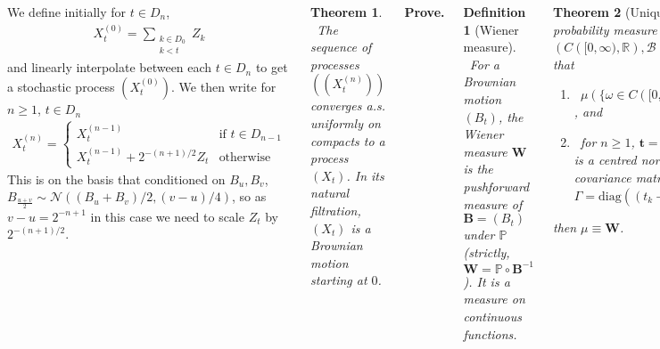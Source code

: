 \documentclass{tikzposter} %
\newcommand\rightopen[2]{\ensuremath{[#1,#2)}}
\newtheorem{theorem}{Theorem}
\newtheorem{definition}{Definition}
\begin{document}
\begin{columns}
{{    We define initially for $t \in D_{n}$,
    \begin{align*}
      X^{(0)}_{t}  = \sum_{\substack{k \in D_{0} \\ k < t}} Z_{k}
    \end{align*}
    and linearly interpolate between each $t \in D_{n}$ to get a stochastic process $(X^{(0)}_{t})$. We then write for $n \ge 1$, $t \in D_{n}$
    \begin{align*}
      X_{t}^{(n)} = \begin{cases}
        X_{t}^{(n-1)} & \text{if $t \in D_{n-1}$} \\
        X_{t}^{(n-1)} + 2^{-(n+1)/2}Z_{t} & \text{otherwise}
        \end{cases}
    \end{align*}
    This is on the basis that conditioned on $B_{u}, B_{v}$, $B_{\frac{u+v}{2}} \sim \mathcal{N}((B_{u}+B_{v})/2, (v-u)/4)$, so as $v-u = 2^{-n+1}$ in this case we need to scale $Z_{t}$ by $2^{-(n+1)/2}$. \\

    \begin{theorem}
    \ The sequence of processes $((X^{(n)}_{t}))$ converges a.s. uniformly on compacts to a process $(X_{t})$. In its natural filtration, $(X_{t})$ is a Brownian motion starting at $0$.
    \end{theorem}

    \textbf{Prove.}
    }
    \hphantom{}

    \begin{definition}[Wiener measure]
    \ For a Brownian motion $(B_{t})$, the Wiener measure $\bm{W}$ is the pushforward measure of $\bm{B} = (B_{t})$ under $\mathbb{P}$ (strictly, $\bm{W} = \mathbb{P}\circ \bm{B}^{-1}$). It is a measure on continuous functions.
    \end{definition}
    \hphantom{}

    \begin{theorem}[Uniqueness]
    \ If $\mu$ is a probability measure on $(C(\rightopen{0}{\infty}, \mathbb{R}), \mathcal{B}(C(\rightopen{0}{\infty}, \mathbb{R})))$ such that
    \begin{enumerate}[label=\roman*.]
\item \ $\mu(\{\omega \in C(\rightopen{0}{\infty}, \mathbb{R}) : \omega(0) = 0\}) = 1$, and
\item \ for $n \ge 1$, $\bm{t} = (t_{1},\dots,t_{n}) \in \mathbb{T}$, $t_{0} = 0$, $\mu_{\bm{t}}$ is a centred normal distribution with covariance matrix $\Gamma = \mathrm{diag}((t_{k}-t_{k-1})_{k=1}^{n})$,
    \end{enumerate}
    then $\mu \equiv \bm{W}$.
    \end{theorem}
    \hphantom{}

}
\end{columns}
\end{document}

